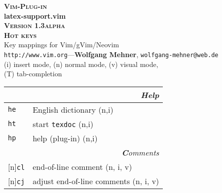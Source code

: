 \documentclass[oneside,10pt,landscape,DIV16]{scrartcl}
\newcommand{\Pluginversion}{1.3alpha}
\newcommand{\Rep}{{\scriptsize{[n]}}}
\newcommand{\Map}[1] {\textbf{\textasciiacute}\texttt{#1}}
\begin{document}
\begin{multicols}{3}
\begin{center}
%
\textbf{\textsc{\small{Vim-Plug-in}}}\\
\textbf{\LARGE{latex-support.vim}}\\
\textbf{\textsc{\small{Version \Pluginversion}}}\\
\vspace{1mm}%
\textbf{\textsc{\Huge{Hot keys}}}\\
\vspace{1mm}%
Key mappings for Vim/gVim/Neovim\\
{\tiny  \texttt{http://www.vim.org}\hspace{1.5mm}---\hspace{1.5mm}\textbf{Wolfgang Mehner},  \texttt{wolfgang-mehner@web.de}}\\
\vspace{1.0mm}
{\normalsize (i)} insert mode, {\normalsize (n)} normal mode, {\normalsize (v)} visual mode,\\
{\normalsize (T)} tab-completion
\vspace{1.0mm}
%
\begin{tabular}[]{|p{11mm}|p{60mm}|}
\hline
\multicolumn{2}{|r|}{\textsl{\textbf{H}elp}}\\[1.0ex]
\hline \Map{he}   & English dictionary              \hfill (n,i)\\
\hline \Map{ht}   & start \texttt{texdoc}           \hfill (n,i)\\
\hline \Map{hp}   & help (plug-in)                  \hfill (n,i)\\
\hline
\hline
\multicolumn{2}{|r|}{\textsl{\textbf{C}omments}}    \\[1.0ex]
\hline \Rep\Map{cl}   & end-of-line comment         \hfill (n, i, v)\\
\hline \Rep\Map{cj}   & adjust end-of-line comments \hfill (n, i, v)\\

\end{tabular}
\end{center}
\end{multicols}
\end{document}
